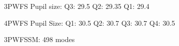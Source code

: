 3PWFS Pupil size:
Q3: 29.5
Q2: 29.35
Q1: 29.4

4PWFS Pupil Size:
Q1: 30.5
Q2: 30.7
Q3: 30.7
Q4: 30.5

3PWFSSM: 498 modes